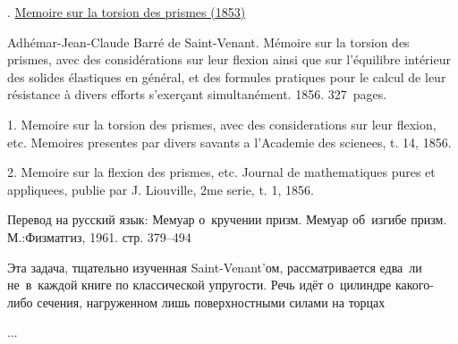 
\label{para:twistingofrods.saintvenant}

\begin{otherlanguage}{russian}

{\small
{}. \href{https://babel.hathitrust.org/cgi/pt?id=hvd.32044091959866&seq=7}{Memoire sur la torsion des prismes (1853)}

Adhémar-Jean-Claude Barré de Saint\hbox{-\hspace{-0.2ex}}Venant.
Mémoire sur la torsion des prismes, avec des considérations sur leur flexion ainsi que sur l'équilibre intérieur des solides élastiques en général, et des formules pratiques pour le calcul de leur résistance à divers efforts s’exerçant simultanément.
1856.
327~pages.

1. Memoire sur la torsion des prismes, avec des considerations sur leur flexion, etc. Memoires presentes par divers savants a l'Academie des scienees, t. 14, 1856.

2. Memoire sur la flexion des prismes, etc. Journal de mathematiques pures et appliquees, publie par J. Liouville, 2me serie, t. 1, 1856.

Перевод на русский язык:
 Мемуар о~кручении призм. Мемуар об~изгибе призм. М.:\;Физ\-мат\-гиз, 1961.
стр. 379--494
\par}

Эта задача, тщательно изученная Saint\hbox{-\hspace{-0.2ex}}Venant’ом, рассматривается едва~ли не~в~каждой книге по классической упругости.
Речь идёт о~цилиндре какого\hbox{-}либо сечения, нагруженном лишь поверхностными силами на торцах

...



\end{otherlanguage}



